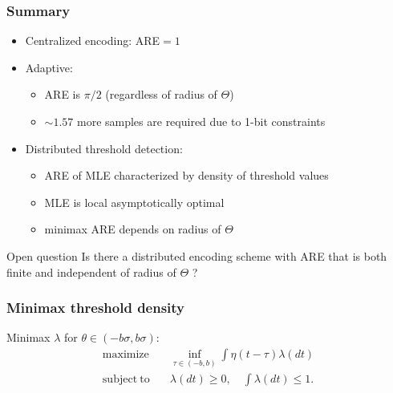 \documentclass[mathserif]{beamer}
\begin{document}
\begin{frame}
\frametitle{Summary}
\begin{itemize}
\pause
\item Centralized encoding: ARE$=1$
\pause
\item Adaptive:
\begin{itemize}
\item ARE is $\pi/2$ (regardless of radius of $\Theta$)
\pause
\item $\sim 1.57$ more samples are required due to 1-bit constraints
\end{itemize}
\pause
\bigskip
\item Distributed threshold detection:
\begin{itemize}
\item ARE of MLE characterized by density of threshold values 
\item MLE is local asymptotically optimal 
\item minimax ARE depends on radius of $\Theta$
\end{itemize}
\end{itemize}

\bigskip
\pause
\begin{alertblock}{Open question}
Is there a distributed encoding scheme with ARE that is both finite and independent of radius of $\Theta$ ?
\end{alertblock}

\end{frame}



\begin{frame}
\frametitle{Minimax threshold density}

Minimax $\lambda$ for $\theta \in (-b\sigma,b\sigma)$:
\begin{align*}
\mathrm{maximize} \quad &  \inf_{\tau \in (-b,b)} \int \eta(t-\tau) \lambda(dt)
\\ \nonumber
\mathrm{subject~to} 
\quad & \lambda(dt)\geq 0,\quad \int \lambda(dt) \leq 1. 
\end{align*}

\end{frame}
\end{document}
